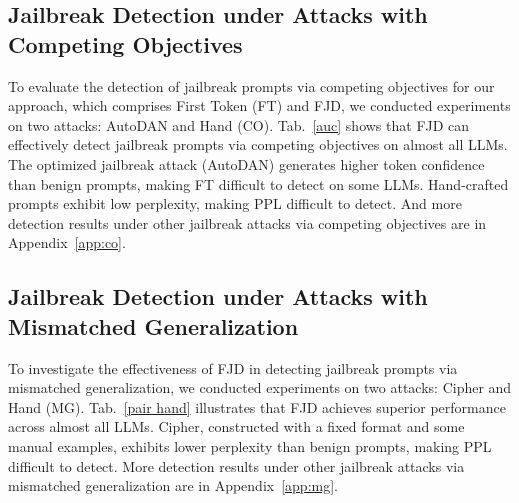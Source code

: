 \documentclass{article}
\begin{document}
\subsection{Jailbreak Detection under Attacks with Competing Objectives}\label{sec:WA}


To evaluate the detection of jailbreak prompts via competing objectives for our approach, which comprises First Token (FT) and FJD, we conducted experiments on two attacks: AutoDAN and Hand (CO). Tab.~\ref{auc} shows that FJD can effectively detect jailbreak prompts via competing objectives on almost all LLMs. The optimized jailbreak attack (AutoDAN) generates higher token confidence than benign prompts, making FT difficult to detect on some LLMs. Hand-crafted prompts exhibit low perplexity, making PPL difficult to detect. And more detection results under other jailbreak attacks via competing objectives are in Appendix~\ref{app:co}.


\subsection{Jailbreak Detection under Attacks with Mismatched Generalization}\label{sec:BA}

To investigate the effectiveness of FJD in detecting jailbreak prompts via mismatched generalization, we conducted experiments on two attacks: Cipher and Hand (MG). Tab.~\ref{pair hand} illustrates that FJD achieves superior performance across almost all LLMs. Cipher, constructed with a fixed format and some manual examples, exhibits lower perplexity than benign prompts, making PPL difficult to detect. More detection results under other jailbreak attacks via mismatched generalization are in Appendix~\ref{app:mg}. 
\end{document}
